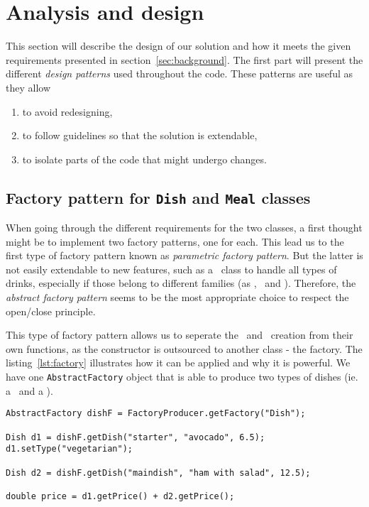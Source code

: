 \section{Analysis and design} %
\label{sec:analysis_and_design}
This section will describe the design of our solution and how
it meets the given requirements presented in section~\ref{sec:background}.
The first part will present the different \emph{design patterns}
used throughout the code.
These patterns are useful as they allow
\begin{enumerate}
  \item to avoid redesigning,
  \item to follow guidelines so that the solution is extendable,
  \item to isolate parts of the code that might undergo changes.
\end{enumerate}

\subsection{Factory pattern for \texttt{Dish} and \texttt{Meal} classes} %
\label{sub:factory_pattern_for_the_texttt_dish_and_texttt_meal_classes}
When going through the different requirements for the two classes, a first thought
might be to implement two factory patterns, one for each.
This lead us to the first type of factory pattern known as \emph{parametric factory pattern}.
But the latter is not easily extendable to new features, such as
a \Drink~class to handle all types of drinks, especially if
those belong to different families (as \Dish, \Meal~and \Drink).
Therefore, the \emph{abstract factory pattern} seems to be the
most appropriate choice to respect the open/close principle.

This type of factory pattern allows us to seperate the \Dish~and \Meal~creation from their own functions, 
as the constructor is outsourced to another class - the factory.
The listing~\ref{lst:factory} illustrates how it can be applied and why it is powerful.
We have one \lstinline|AbstractFactory| object that is able to produce
two types of dishes (ie. a \Starter~and a \MainDish).

\begin{lstlisting}[caption=Factory pattern for \Dish~and \Meal.,
label=lst:factory]
AbstractFactory dishF = FactoryProducer.getFactory("Dish");

Dish d1 = dishF.getDish("starter", "avocado", 6.5);
d1.setType("vegetarian");

Dish d2 = dishF.getDish("maindish", "ham with salad", 12.5);

double price = d1.getPrice() + d2.getPrice();
\end{lstlisting}

